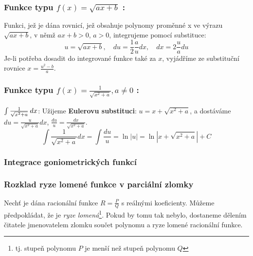 {      %
      \subsubsection*{Funkce typu $\boxed{f(x)=\sqrt{ax+b}}$ :}
         Funkci, jež je dána rovnicí, jež obsahuje polynomy proměnné x  ve výrazu $\sqrt{ax+b}$,
         v němž $ax+b>0$, $a>0$, integrujeme pomocí substituce:
         \begin{equation}\label{ma:eq_sub_fce1}
             u=\sqrt{ax+b},\quad du=\frac{1}{2}\frac{a}{u}dx,\quad dx=2\frac{u}{a}du
         \end{equation}
         Je-li potřeba dosadit do integrované funkce také za $x$, vyjádříme ze substituční
         rovnice $x=\frac{u^2-b}{a}$.
      \subsubsection*{Funkce typu $\boxed{f(x)=\frac{1}{\sqrt{x^2+a}}}, a\neq0$ :}
         \begin{example}\label{ma:ex_sub_metoda1}
           \(\int\frac{1}{\sqrt{x^2+a}}\hspace{2pt}dx\):\vskip0.5mm
           Užijeme \textbf{Eulerovu substituci}: \(u=x+\sqrt{x^2+a}\), a dostáváme
           \(du=\frac{u}{\sqrt{x^2+a}}dx\), \(\frac{du}{u}=\frac{dx}{\sqrt{x^2+a}}\).
           \begin{equation*}
             \int{\frac{1}{\sqrt{x^2+a}}dx}=\int{\frac{du}{u}}=\ln|u|=\ln|x+\sqrt{x^2+a}|+C
           \end{equation*}
         \end{example}
  
    \subsubsection{Integrace goniometrických funkcí}
      
    \subsubsection{Rozklad ryze lomené funkce v parciální zlomky}
      Nechť je dána racionální funkce $R = \frac{P}{Q}$ s reálnými koeficienty. Můžeme
      předpokládat, že je \emph{ryze lomená}\footnote{tj. stupeň polynomu $P$ je menší než
      stupeň polynomu $Q$}. Pokud by tomu tak nebylo, dostaneme dělením čitatele jmenovatelem
      zlomku součet polynomu a ryze lomené racionální funkce.
      
}
